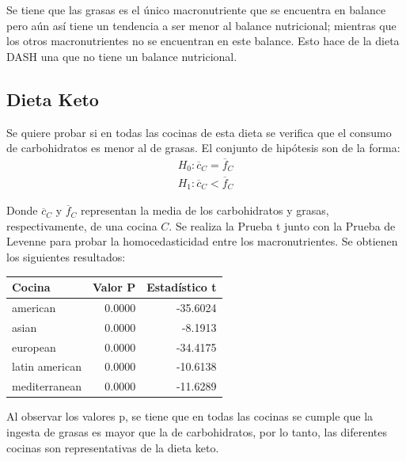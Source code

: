 \documentclass[12pt,a4paper]{article}
\begin{document}
{{            Se tiene que las grasas es el único macronutriente que se encuentra en 
            balance pero aún así tiene un tendencia a ser menor al balance nutricional; 
            mientras que los otros macronutrientes no se encuentran en este balance.
             Esto hace 
            de la dieta DASH una que no tiene un balance nutricional.
        }

        \subsection{Dieta Keto}
        {
            Se quiere probar si en todas las cocinas de esta dieta 
            se verifica que el consumo de carbohidratos es menor al de grasas. 
            El conjunto de hipótesis son de la forma:
            \begin{align*}
                H_0 : \overline{c}_C = \overline{f}_C \\
                H_1 : \overline{c}_C < \overline{f}_C
            \end{align*}

            Donde $\overline{c}_C$ y $\overline{f}_C$ representan 
            la media de los carbohidratos y grasas, respectivamente, de 
            una cocina $C$. Se realiza la Prueba t junto con la Prueba de Levenne para 
            probar la homocedasticidad entre los macronutrientes. Se 
            obtienen los siguientes resultados:

            \begin{center}
                \begin{tabular}{lrr}
                \toprule
                    Cocina & Valor P & Estadístico t \\
                \midrule
                    american       & 0.0000 & -35.6024 \\
                    asian          & 0.0000 &  -8.1913 \\
                    european       & 0.0000 & -34.4175 \\
                    latin american & 0.0000 & -10.6138 \\
                    mediterranean  & 0.0000 & -11.6289 \\
                \bottomrule
                \end{tabular}
            \end{center}

            Al observar los valores p, se tiene que en todas las cocinas se cumple 
            que la ingesta de grasas es mayor que la de carbohidratos, por lo 
            tanto, las diferentes cocinas son representativas de la dieta keto.
        }

}
\end{document}
